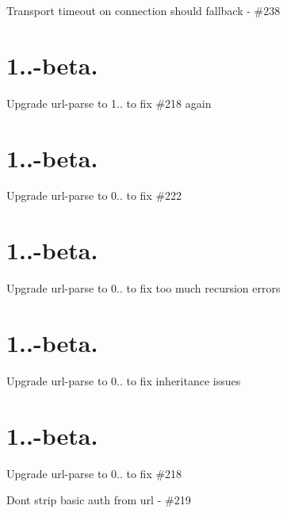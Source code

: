 \begin{DoxyItemize}
\item Transport timeout on connection should fallback -\/ \#238
\end{DoxyItemize}

\section*{1..-\/beta. }


\begin{DoxyItemize}
\item Upgrade {\ttfamily url-\/parse} to 1.. to fix \#218 again
\end{DoxyItemize}

\section*{1..-\/beta. }


\begin{DoxyItemize}
\item Upgrade {\ttfamily url-\/parse} to 0.. to fix \#222
\end{DoxyItemize}

\section*{1..-\/beta. }


\begin{DoxyItemize}
\item Upgrade {\ttfamily url-\/parse} to 0.. to fix \textquotesingle{}too much recursion\textquotesingle{} errors
\end{DoxyItemize}

\section*{1..-\/beta. }


\begin{DoxyItemize}
\item Upgrade {\ttfamily url-\/parse} to 0.. to fix inheritance issues
\end{DoxyItemize}

\section*{1..-\/beta. }


\begin{DoxyItemize}
\item Upgrade {\ttfamily url-\/parse} to 0.. to fix \#218
\item Don\textquotesingle{}t strip basic auth from url -\/ \#219
\end{DoxyItemize}

